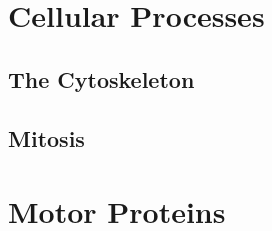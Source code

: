 \section{Cellular Processes}
	\subsection{The Cytoskeleton}
	\subsection{Mitosis} 
\section{Motor Proteins}
